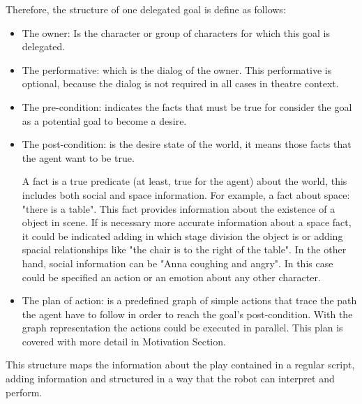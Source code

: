 Therefore, the structure of one delegated goal is define as follows:
\begin{itemize}

\item The owner: Is the character or group of characters for which this goal is delegated.

\item The performative: which is the dialog of the owner. This performative is optional, because the dialog is not required in all cases in theatre context.

\item The pre-condition: indicates the facts that must be true for consider the goal as a potential goal to become a desire.

\item The post-condition: is the desire state of the world, it means those facts that the agent want to be true.

A fact is a true predicate (at least, true for the agent) about the world, this includes both social and space information. For example, a fact about space: "there is a table". This fact provides information about the existence of a object in scene. If is necessary more accurate information about a space fact, it could be indicated adding in which stage division the object is or adding spacial relationships like "the chair is to the right of the table". In the other hand, social information can be "Anna coughing and angry". In this case could be specified an action or an emotion about any other character.

\item The plan of action: is a predefined graph of simple actions that trace the path the agent have to follow in order to reach the goal's post-condition. With the graph representation the actions could be executed in parallel. This plan is covered with more detail in Motivation Section.
\end{itemize}
This structure maps the information about the play contained in a regular script, adding information and structured in a way that the robot can interpret and perform.  

